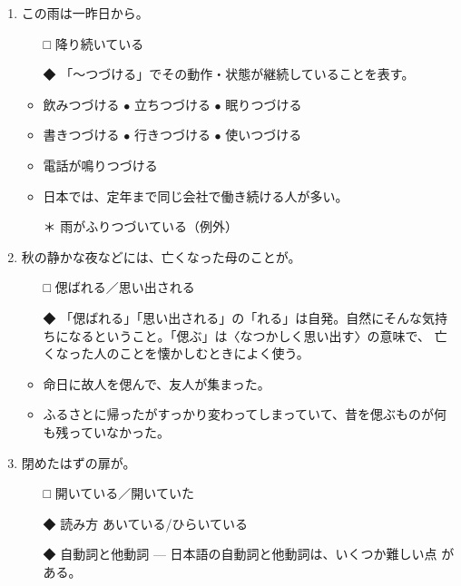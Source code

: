 \documentclass[
uplatex,
b5paper,
10pt,
dvipdfmx
]{jsbook}
\begin{document}
\begin{enumerate}
\item この雨は一昨日から\underline{\hspace{3zw}}。
\begin{itemize}
\item[□] 降り続いている
\item[◆] 「〜つづける」でその動作・状態が継続していることを表す。
\end{itemize}
\begin{itemize}
\item 飲みつづける $\bullet$ 立ちつづける $\bullet$ 眠りつづける
\item 書きつづける $\bullet$ 行きつづける $\bullet$ 使いつづける
\item 電話が鳴りつづける  
\item 日本では、定年まで同じ会社で働き続ける人が多い。 
\item[＊] 雨がふりつづいている（例外）
\end{itemize}

\item 秋の静かな夜などには、亡くなった母のことが\underline{\hspace{3zw}}。

\begin{itemize}
\item[□] 偲ばれる／思い出される
\item[◆] 「偲ばれる」「思い出される」の「れる」は自発。自然にそんな気持
	  ちになるということ。「偲ぶ」は〈なつかしく思い出す〉の意味で、
	  亡くなった人のことを懐かしむときによく使う。
\end{itemize}
\begin{itemize}
 \item 命日に故人を偲んで、友人が集まった。 
 \item ふるさとに帰ったがすっかり変わってしまっていて、昔を偲ぶものが何
       も残っていなかった。
\end{itemize}

\item 閉めたはずの扉が\underline{\hspace{3zw}}。

\begin{itemize}
\item[□] 開いている／開いていた
\item[◆] 読み方  あいている/ひらいている
\item[◆] 自動詞と他動詞 --- 日本語の自動詞と他動詞は、いくつか難しい点
	  がある。
\end{itemize}


\end{enumerate}
\end{document}
